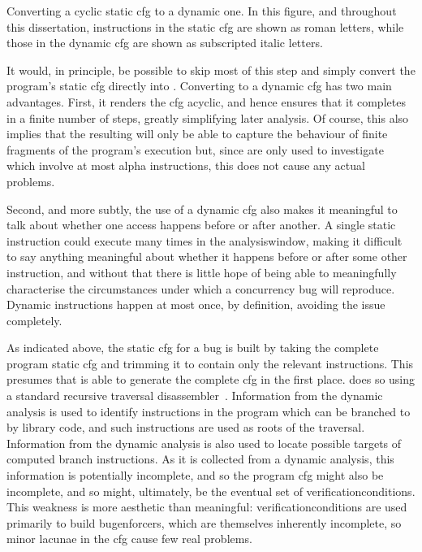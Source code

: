 \begin{sanefig}
\caption{Converting a cyclic \gls{static cfg} to a dynamic one.  In
  this figure, and throughout this dissertation, instructions in the
  \gls{static cfg} are shown as roman letters, while those in the
  \gls{dynamic cfg} are shown as subscripted italic letters.}
\label{fig:cyclic_cfg}
\end{sanefig}

It would, in principle, be possible to skip most of this step and
simply convert the program's \gls{static cfg} directly into
{\AStateMachine}.  Converting to a \gls{dynamic cfg} has two main
advantages.  First, it renders the \gls{cfg} acyclic, and hence
ensures that it completes in a finite number of steps, greatly
simplifying later analysis.  Of course, this also implies that the
resulting {\StateMachine} will only be able to capture the behaviour
of finite fragments of the program's execution but, since
{\StateMachines} are only used to investigate  which involve at most \gls{alpha}
instructions, this does not cause any actual problems.

Second, and more subtly, the use of a \gls{dynamic cfg} also makes it
meaningful to talk about whether one access happens before or after
another.  A single static instruction could execute many times in the
\gls{analysiswindow}, making it difficult to say anything meaningful
about whether it happens before or after some other instruction, and
without that there is little hope of being able to meaningfully
characterise the circumstances under which a concurrency bug will
reproduce.  Dynamic instructions happen at most once, by definition,
avoiding the issue completely.

As indicated above, the \gls{static cfg} for a bug is built by taking
the complete program \gls{static cfg} and trimming it to contain only
the relevant instructions.  This presumes that {\technique} is able to
generate the complete \gls{cfg} in the first place.  {\Technique} does
so using a standard recursive traversal disassembler~\cite{Schwarz}.
Information from the dynamic analysis is used to identify instructions
in the program which can be branched to by library code, and such
instructions are used as roots of the traversal.  Information from the
dynamic analysis is also used to locate possible targets of computed
branch instructions.  As it is collected from a dynamic analysis, this
information is potentially incomplete, and so the program \gls{cfg}
might also be incomplete, and so might, ultimately, be the eventual
set of \glspl{verificationcondition}.  This weakness is more aesthetic
than meaningful: \glspl{verificationcondition} are used primarily to
build \glspl{bugenforcer}, which are themselves inherently incomplete,
so minor lacunae in the \gls{cfg} cause few real problems.

